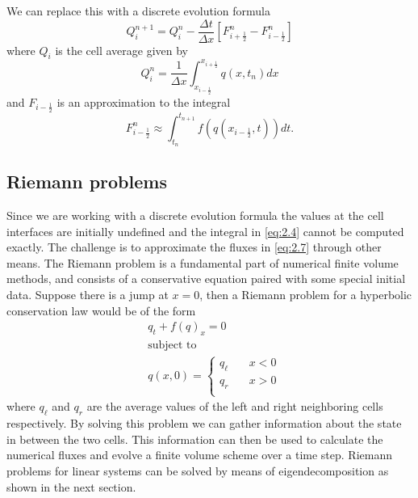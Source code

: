 \documentclass[twoside]{bsu-ms}
\begin{document}
We can replace this with a discrete evolution formula
\begin{equation}\label{eq:2.5}
    Q_{i}^{n+1}=Q_{i}^{n}-\frac{\Delta t}{\Delta x}\left[F_{i+\frac{1}{2}}^{n}-F_{i-\frac{1}{2}}^{n}\right]
\end{equation}
where $Q_i$ is the cell average given by
\begin{equation}\label{eq:2.6}
Q_i^n = \frac{1}{\Delta x}\int_{x_{i-\frac{1}{2}}}^{x_{i+\frac{1}{2}}}q(x,t_{n})dx
\end{equation}
and  $F_{i-\frac{1}{2}}$ is an approximation to the integral 
\begin{equation}\label{eq:2.7}
F_{i-\frac12}^n \approx 
\int_{t_{n}}^{t_{n+1}}f\left(q\left(x_{i-\frac{1}{2}},t\right)\right)dt.
\end{equation}

\subsection{Riemann problems}\label{subsec:2.1.1}
Since we are working with a discrete evolution formula the values at the cell interfaces are initially undefined and the integral in \eqref{eq:2.4} cannot be computed exactly. The challenge is to approximate the fluxes in \eqref{eq:2.7} through other means. The Riemann problem is a fundamental part of numerical finite volume methods, and consists of a conservative equation paired with some special initial data. Suppose there is a jump at $x=0$, then a Riemann problem for a hyperbolic conservation law would be of the form
\begin{equation}\label{eq:2.8}
\begin{split}
    &q_{t}+f(q)_{x}=0\\
    &\text{subject to}\\
    &q(x,0)=\begin{cases}
        q_{\ell}\quad& x<0\\
        q_{r}\quad&x>0\\
    \end{cases}
    \end{split}
\end{equation}
where $q_{\ell}$ and $q_{r}$ are the average values of the left and right neighboring cells respectively. By solving this problem we can gather information about the state in between the two cells. This information can then be used to calculate the numerical fluxes and evolve a finite volume scheme over a time step. Riemann problems for linear systems can be solved by means of eigendecomposition as shown in the next section.
\end{document}
